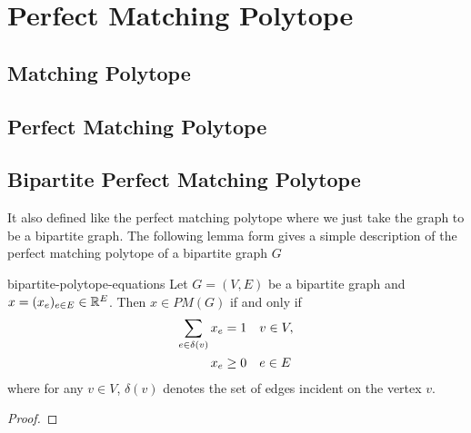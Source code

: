 \chapter{Perfect Matching Polytope}
\section{Matching Polytope}
\section{Perfect Matching Polytope}
\section{Bipartite Perfect Matching Polytope}
It also defined like the perfect matching polytope where we just take the graph to be a bipartite graph. The following lemma form \cite{LovaszPlummer_1986_BOOK} gives a simple description of the perfect matching polytope of a bipartite graph $G$ 
\begin{Theorem}{\cite{LovaszPlummer_1986_BOOK}}{bipartite-polytope-equations}
	Let $G=(V,E)$ be a bipartite graph and $x=(x_e)_{e\in E}\in \mathbb{R}^E$. Then $x\in PM(G)$ if and only if \begin{align*}
		\sum_{e\in\delta(v)}x_e=1 &\quad v\in V,\\
		x_e\geq 0&\quad e\in E
	\end{align*}where for any $v\in V$, $\delta(v)$ denotes the set of edges incident on the vertex $v$.
\end{Theorem}
\begin{proof}

\end{proof}

